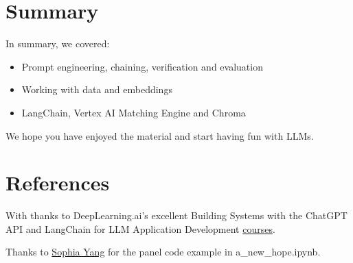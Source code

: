 \documentclass[
  letterpaper,
  DIV=11,
  numbers=noendperiod]{scrreprt}
\newlength{\cslhangindent}
\newlength{\cslentryspacingunit} %
\newenvironment{CSLReferences}[2] %
 {%
  \setlength{\parindent}{0pt}
  \ifodd #1
  \let\oldpar\par
  \def\par{\hangindent=\cslhangindent\oldpar}
  \fi
  \setlength{\parskip}{#2\cslentryspacingunit}
 }%
 {}
\begin{document}

\hypertarget{summary-1}{%
\chapter{Summary}\label{summary-1}}

In summary, we covered:

\begin{itemize}
\item
  Prompt engineering, chaining, verification and evaluation
\item
  Working with data and embeddings
\item
  LangChain, Vertex AI Matching Engine and Chroma
\end{itemize}

We hope you have enjoyed the material and start having fun with LLMs.


\hypertarget{references}{%
\chapter*{References}\label{references}}


\hypertarget{refs}{}
\begin{CSLReferences}{0}{0}
\end{CSLReferences}

With thanks to DeepLearning.ai's excellent Building Systems with the
ChatGPT API and LangChain for LLM Application Development
\href{https://www.deeplearning.ai/short-courses/}{courses}.

Thanks to
\href{https://github.com/sophiamyang/tutorials-LangChain}{Sophia Yang}
for the panel code example in a\_new\_hope.ipynb.
\end{document}
